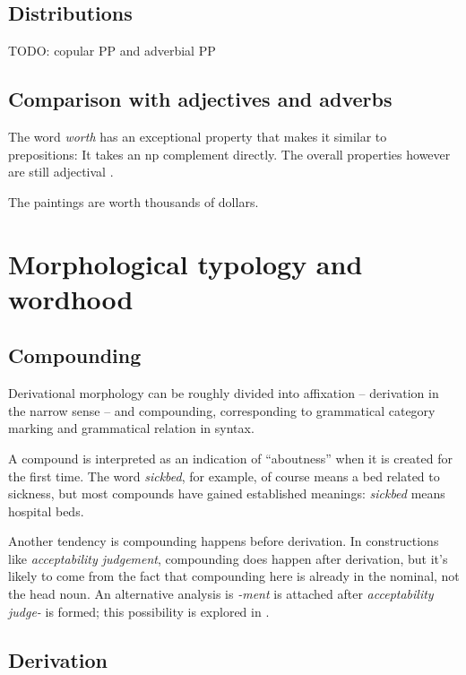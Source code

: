 \documentclass[UTF8, a4paper, oneside, scheme=plain, 12pt]{ctexbook}
\newcommand*{\citepage}[1]{p.~{#1}}
\newcommand{\form}[1]{\emph{#1}}
\begin{document}
\subsection{Distributions}

TODO: copular PP and adverbial PP

\subsection{Comparison with adjectives and adverbs}

The word \form{worth} has an exceptional property
that makes it similar to prepositions:
It takes an \acs{np} complement directly.
The overall properties however are still adjectival \citep[\citepage{607}]{cgel}.

\begin{exe}
    \ex The paintings are worth thousands of dollars.
\end{exe}

\section{Morphological typology and wordhood}\label{sec:pos.morphology}


\subsection{Compounding}\label{sec:pos.overview.derivation.compound}

Derivational morphology can be roughly divided into 
affixation -- derivation in the narrow sense -- and compounding,
corresponding to grammatical category marking and grammatical relation in syntax.


A compound is interpreted as an indication of ``aboutness''
when it is created for the first time.
The word \form{sickbed}, 
for example, of course means a bed related to sickness,
but most compounds have gained established meanings:
\form{sickbed} means hospital beds.

Another tendency is compounding happens before derivation.
In constructions like \form{acceptability judgement},
compounding does happen after derivation,
but it's likely to come from the fact that 
compounding here is already in the nominal,
not the head noun.
An alternative analysis is \form{-ment} is attached after 
\form{acceptability judge-} is formed; 
this possibility is explored in .

\subsection{Derivation}\label{sec:pos.overview.derivation.derivation}
\end{document}
